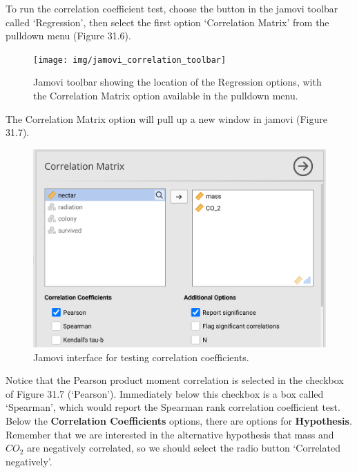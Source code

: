 \documentclass[
]{scrbook}
\begin{document}
\begin{verbatim}

\end{verbatim}

To run the correlation coefficient test, choose the button in the jamovi toolbar called `Regression', then select the first option `Correlation Matrix' from the pulldown menu (Figure 31.6).

\begin{figure}
\texttt{[image: img/jamovi\_correlation\_toolbar]} \caption{Jamovi toolbar showing the location of the Regression options, with the Correlation Matrix option available in the pulldown menu.}\label{fig:unnamed-chunk-156}
\end{figure}

The Correlation Matrix option will pull up a new window in jamovi (Figure 31.7).

\begin{figure}
\includegraphics[width=1\linewidth]{img/jamovi_correlation_interface} \caption{Jamovi interface for testing correlation coefficients.}\label{fig:unnamed-chunk-157}
\end{figure}

Notice that the Pearson product moment correlation is selected in the checkbox of Figure 31.7 (`Pearson').
Immediately below this checkbox is a box called `Spearman', which would report the Spearman rank correlation coefficient test.
Below the \textbf{Correlation Coefficients} options, there are options for \textbf{Hypothesis}.
Remember that we are interested in the alternative hypothesis that mass and \(CO_{2}\) are negatively correlated, so we should select the radio button `Correlated negatively'.
\end{document}
